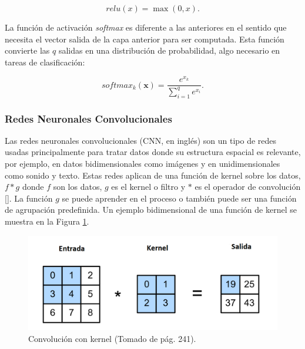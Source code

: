\begin{equation}
	relu(x) = \max(0, x).
\end{equation}

La función de activación \emph{softmax} es diferente a las anteriores en el sentido que necesita
el vector salida de la capa anterior para ser computada. Esta función convierte las $q$ salidas
en una distribución de probabilidad, algo necesario en tareas de clasificación:

\begin{equation}
	softmax_k(\textbf{x}) = \frac{e^{x_k}}{\sum\limits_{i=1}^{q} e^{x_i}}.
\end{equation}

\subsubsection{Redes Neuronales Convolucionales}

Las redes neuronales convolucionales (CNN, en inglés) 
son un tipo de redes usadas
principalmente para tratar datos donde su estructura espacial es relevante, por ejemplo,
en datos bidimensionales como imágenes y en unidimensionales como sonido y texto.
Estas redes aplican de una función de kernel sobre los datos, $f * g$ donde $f$ son los
datos, $g$ es el kernel o filtro y $*$ es el operador de convolución [\cite{d2l}]. La función $g$ se puede 
aprender en el proceso o también puede ser una función de agrupación predefinida. 
Un ejemplo bidimensional de una función de kernel se muestra en la Figura \ref{fig:conv_kernel}.

\begin{figure}[h!]
	\begin{center}
		\begin{center}
			\includegraphics[scale=.2]{Graphics/kernel_convolution.png}
        \end{center}
	    \caption{Convolución con kernel (Tomado de \textcite{d2l} pág. 241).}\label{fig:conv_kernel}
	\end{center}
\end{figure}

